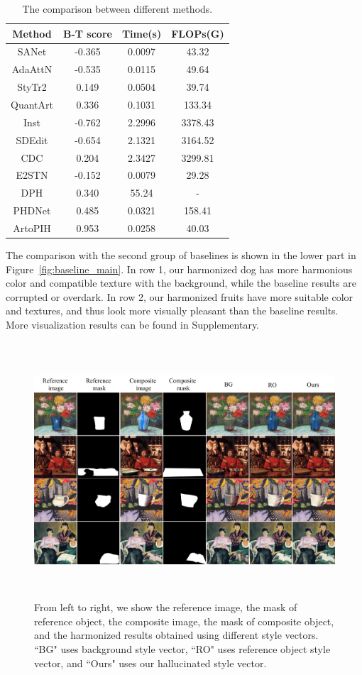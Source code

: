 \documentclass[letterpaper]{article} %
\begin{document}
\begin{table}[t]
\centering
\begin{tabular}{c|c|c|c}
\hline
Method  & B-T score & Time(s)  & FLOPs(G) \\
\hline
SANet  & -0.365 & 0.0097 & 43.32\\
AdaAttN  & -0.535 & 0.0115 & 49.64\\
StyTr2  &  0.149 & 0.0504 & 39.74\\
QuantArt   & 0.336 & 0.1031 & 133.34 \\
Inst  & -0.762 & 2.2996 & 3378.43 \\
\hline
SDEdit  & -0.654 & 2.1321 & 3164.52\\
CDC   &  0.204 & 2.3427 & 3299.81 \\
E2STN & -0.152 & 0.0079 & 29.28\\
DPH   & 0.340 & 55.24 & -\\
PHDNet  & 0.485 & 0.0321 & 158.41\\
\hline
ArtoPIH  & 0.953 & 0.0258 & 40.03\\
\hline
\end{tabular}
\caption{The comparison between different methods. }
\label{tab:results}
\end{table}

The comparison with the second group of baselines is shown in the lower part in Figure~\ref{fig:baseline_main}. In row 1, our harmonized dog has more harmonious color and compatible texture with the background, while the baseline results are corrupted or overdark. In row 2, our harmonized fruits have more suitable color and textures, and thus look more visually pleasant than the baseline results. More visualization results can be found in Supplementary.



\begin{figure}[t]
\centering
\includegraphics[width=0.855\linewidth,height=3.75in ]{figures/reference_results.jpg}
\caption{From left to right, we show the reference image, the mask of reference object, the composite image, the mask of composite object, and the harmonized results obtained using different style vectors. ``BG" uses background style vector, ``RO" uses reference object style vector, and ``Ours" uses our hallucinated style vector.}
\label{fig:reference_results}
\end{figure}
\end{document}
